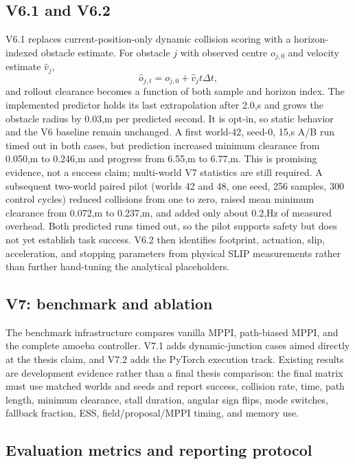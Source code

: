 \documentclass[11pt,a4paper]{article}
\begin{document}
\subsection{V6.1 and V6.2}

V6.1 replaces current-position-only dynamic collision scoring with a
horizon-indexed obstacle estimate. For obstacle $j$ with observed centre
$o_{j,0}$ and velocity estimate $\hat v_j$,
\begin{equation}
  \hat o_{j,t}=o_{j,0}+\hat v_j t\Delta t,
\end{equation}
and rollout clearance becomes a function of both sample and horizon index.
The implemented predictor holds its last extrapolation after 2.0,s and grows
the obstacle radius by 0.03,m per predicted second. It is opt-in, so static
behavior and the V6 baseline remain unchanged. A first world-42, seed-0,
15,s A/B run timed out in both cases, but prediction increased minimum
clearance from 0.050,m to 0.246,m and progress from 6.55,m to 6.77,m. This
is promising evidence, not a success claim; multi-world V7 statistics are
still required. A subsequent two-world paired pilot (worlds 42 and 48,
one seed, 256 samples, 300 control cycles) reduced collisions from one to
zero, raised mean minimum clearance from 0.072,m to 0.237,m, and added only
about 0.2,Hz of measured overhead. Both predicted runs timed out, so the
pilot supports safety but does not yet establish task success. V6.2 then
identifies footprint,
actuation, slip, acceleration, and stopping parameters from physical SLIP
measurements rather than further hand-tuning the analytical placeholders.

\subsection{V7: benchmark and ablation}

The benchmark infrastructure compares vanilla MPPI, path-biased MPPI, and the
complete amoeba controller. V7.1 adds dynamic-junction cases aimed directly at
the thesis claim, and V7.2 adds the PyTorch execution track. Existing results
are development evidence rather than a final thesis comparison: the final
matrix must use matched worlds and seeds and report success, collision rate,
time, path length, minimum clearance, stall duration, angular sign flips, mode
switches, fallback fraction, ESS, field/proposal/MPPI timing, and memory use.

\subsection{Evaluation metrics and reporting protocol}
\end{document}
